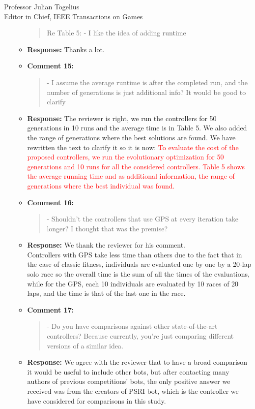 \documentclass[10pt]{letter} %
\begin{document}
\begin{letter}{Professor Julian Togelius \\ Editor in Chief, IEEE Transactions on Games}
\begin{enumerate}
\begin{itemize}
				\begin{quote}	
					Re Table 5:
					- I like the idea of adding runtime
				\end{quote}	
			\item {\bf Response:} 
						Thanks a lot.
			\item {\bf Comment 15:}
				\begin{quote}	
					- I assume the average runtime is after the completed run, and the number of generations is just additional info? It would be good to clarify
				\end{quote}	
			\item {\bf Response:} 
					The reviewer is right, we run the  controllers for 50 generations in 10 runs and the average time is in Table 5. We also added the range of generations where the best solutions are found.
					We have rewritten the text to clarify it so it is now:
						\textcolor{red}{
						To evaluate the cost of the proposed controllers, we run the evolutionary optimization for 50 generations and 10 runs for all the considered controllers.
						Table 5 shows the average running time and  as additional information, the range of generations where the best individual was found. } 
			\item {\bf Comment 16:}
				\begin{quote}	
				- Shouldn't the controllers that use GPS at every iteration take longer? I thought that was the premise?
				\end{quote}	
			\item {\bf Response:} 
				We thank the reviewer for his comment. \\
				Controllers with GPS take less time than others due to the fact that in the case of classic fitness, individuals are evaluated one by one by a 20-lap solo race so the overall time is the sum of all the times of the evaluations, while for the GPS, each 10 individuals are evaluated by 10 races of 20 laps, and the time is that of the last one in the race.
			\item {\bf Comment 17:}
				\begin{quote}	
					- Do you have comparisons against other state-of-the-art controllers? Because currently, you're just comparing different versions of a similar idea.
				\end{quote}	

			\item {\bf Response:} 
		We agree with the reviewer that to have a broad comparison it would be useful to include other bots, but after contacting many authors of previous competitions' bots, the only positive answer we received was from the creators of PSRI bot, which is the controller we have considered for comparisons in this study.
			

\end{itemize}
\end{enumerate}
\end{letter}
\end{document}

